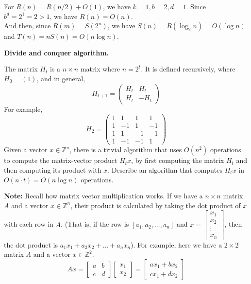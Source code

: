 \documentclass[11pt,addpoints]{exam}
\begin{document}
\begin{questions}
\begin{parts}
    \begin{solution}
    For \(R(n) = R(n/2) + O(1)\), we have \(k = 1, b = 2, d = 1\). Since \(b^d = 2^1 = 2 > 1\), we have \(R(n) = O(n)\).
    \\And then, since \(R(m) = S(2^n)\), we have \(S(n) = R(\log_2 n) = O(\log n)\) and \(T(n) = nS(n) = O(n\log n)\).
    \end{solution}
    \end{parts}

\question[15] \textbf{Divide and conquer algorithm.}

The matrix $H_t$ is a $n\times n$ matrix where $n=2^t$.
It is defined recursively, where $H_0 = (1)$, and in general,
\[
H_{t+1} = \left(
\begin{array}{rr}
H_t  & H_t\\
H_t  & - H_t
\end{array}
\right)
\]
For example,
\[
H_2 = \left(
\begin{array}{rrrr}
1 & 1 & 1 & 1 \\
1 & -1& 1 & -1\\
1 & 1 & -1 & -1\\
1 & -1 & -1 & 1
\end{array}
\right)
\]
Given a vector $x \in \mathbb{Z}^{n}$, there is a trivial algorithm that uses $O(n^2)$ operations to compute the matrix-vector product $H_t x$, by first computing the matrix $H_t$ and then computing its product with $x$.
Describe an algorithm that computes $H_t x$ in $O(n \cdot t)=O(n\log n)$ operations.

\textbf{Note: } Recall how matrix vector multiplication works. If we have a $n\times n$ matrix $A$ and a vector $x\in \mathbb{Z}^n$, their product is calculated by taking the dot product of $x$ with each row in $A$. (That is, if the row is $[a_1, a_2, ..., a_n]$ and $x = \begin{bmatrix}
       x_1 \\
       x_2 \\
       \vdots \\
       x_n
       \end{bmatrix}$, then the dot product is $a_1x_1 + a_2x_2 + ... + a_nx_n$). For example, here we have a $2\times 2$ matrix $A$ and a vector $x\in \mathbb{Z}^2$.
\begin{equation*}
       A x = 
       \begin{bmatrix}
       a & b \\
       c & d
       \end{bmatrix}
       \begin{bmatrix}
       x_1 \\
       x_2
       \end{bmatrix}
       = 
       \begin{bmatrix}
       ax_1 + bx_2 \\
       cx_1 + dx_2
       \end{bmatrix}
   \end{equation*}


\end{questions}
\end{document}
